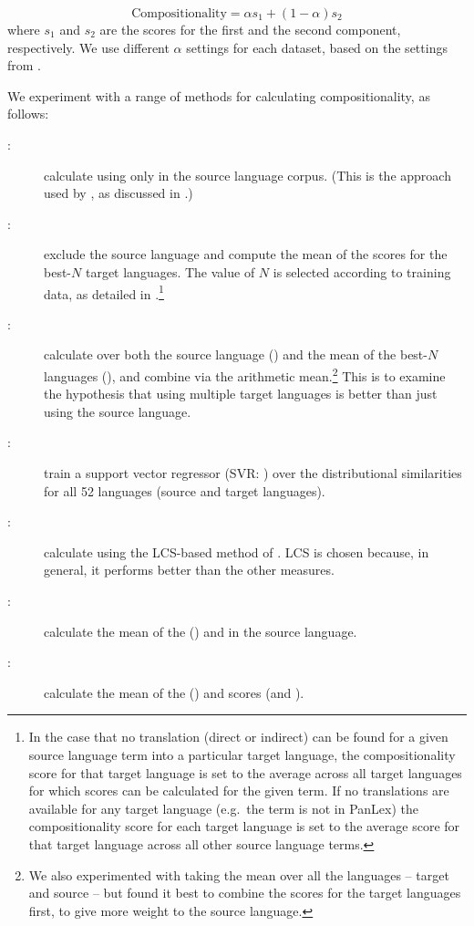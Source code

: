 \documentclass[output=paper,modfonts,nonflat]{langsci/langscibook}
\begin{document}
\begin{equation}
  \text{Compositionality} = \alpha s_{1} + (1-\alpha) s_{2}
  \label{eq:comp}
\end{equation} 
where $s_{1}$ and $s_{2}$ are the scores for the first and the second
component, respectively. We use different $\alpha$ settings for each
dataset, based on the settings from .

We experiment with a range of methods for calculating
compositionality, as follows:
\begin{description}
\item[\CSsource:] calculate  using only
   in the source language corpus. (This is
  the approach used by \citet{reddy2011a}, as discussed in .)
\item[\CStarg:] exclude the source language and compute the mean of
  the  scores for the best-$N$ target
  languages. The value of $N$ is selected according to training data,
  as detailed in .\footnote{In the case
    that no translation (direct or indirect) can be found for a given
    source language term into a particular target language, the
    compositionality score for that target language is set to the
    average across all target languages for which scores can be
    calculated for the given term. If no translations are available
    for any target language (e.g.\ the term is not in PanLex) the
    compositionality score for each target language is set to the
    average score for that target language across all other source
    language terms.}
\item[\CSsourcetarg:] calculate  over both the
  source language (\CSsource) and the mean of the best-$N$ languages
  (\CStarg), and combine via the arithmetic mean.\footnote{We also
    experimented with taking the mean over all the languages -- target
    and source -- but found it best to combine the scores for the
    target languages first, to give more weight to the source language.}
  This is to examine the hypothesis that using multiple target languages
  is better than just using the source language.
\item[\CSsvr:] train a support vector regressor (SVR:
  \citet{Smola:Scholkopf:2004}) over the distributional similarities
  for all 52 languages (source and target languages).
\item[\CSstring:] calculate  using the LCS-based method
  of . 
	LCS is chosen because, in general, it performs better than 
	the other  measures.
\item[\CSstringDS:] calculate the mean of the  (\CSstring)
  and  in the source language.
\item[\CSall:] calculate the mean of the  (\CSstring)
  and  scores (\CSsource and \CStarg).
\end{description}
\end{document}

